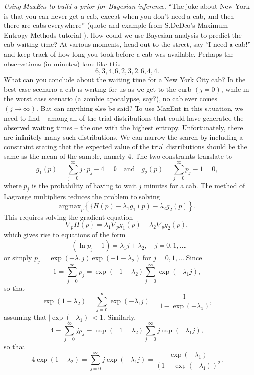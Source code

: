 \begin{Example} {\textit{Using MaxEnt to build a prior for Bayesian inference}.} ``The joke about New York is that you can never get a cab, except when you don't need a cab, and then there are cabs everywhere'' (quote and example from S.DeDeo's Maximum Entropy Methods tutorial \cite{BDA_N14}). How could we use Bayesian analysis to predict the cab waiting time? At various moments, head out to the street, say ``I need a cab!'' and keep track of how long you took before a cab was available. Perhaps the observations (in minutes) look like this $$6,3,4,6,2,3,2,6,4,4.$$ What can you conclude about  the waiting time for a New York City cab? In the best case scenario a cab is waiting for us as we get to the curb $(j=0)$, while in the worst case scenario (a zombie apocalypse, say?), no cab ever comes $(j\to\infty)$. But can anything else be said? \newl 
To use MaxEnt in this situation, we need to find -- among all of the trial distributions that could have generated the observed waiting times -- the one with the highest entropy. Unfortunately, there are infinitely many such distributions. We can narrow the search by including a constraint stating that the expected value of the trial distributions should be the same as the mean of the sample, namely 4.  \newl The two constraints translate to $$g_1(p)=\sum_{j=0}^{\infty}j\cdot p_j -4=0 \quad \mbox{and}\quad g_2(p)= \sum_{j=0}^{\infty}p_j-1=0,$$ where $p_j$ is the probability of having to wait $j$ minutes for a cab. \newl The method of Lagrange multipliers reduces the problem to solving $$\text{argmax}_{p} \left\{\{H(p) - \lambda_1 g_1(p)-\lambda_2g_2(p)\right\}.$$ This requires solving the gradient equation $$\nabla_p H(p) = \lambda_1\nabla_p g_1(p) + \lambda_2\nabla_p g_2(p), $$ which gives rise to equations of the form $$-(\ln p_j +1) = \lambda_1 j + \lambda_2, \quad {j=0,1, \ldots,}$$ or simply $p_j=\exp(-\lambda_1j)\exp(-1-\lambda_2)$ for $j=0, 1, \ldots $ Since $$1=\sum_{j=0}^{\infty}p_j = \exp(-1-\lambda_2)\sum_{j=0}^{\infty}\exp(-\lambda_1j), $$ so that \begin{equation}\label{eq1}\exp(1+\lambda_2) = \sum_{j=0}^{\infty}\exp(-\lambda_1j)=\frac{1}{1-\exp(-\lambda_1)},\end{equation} assuming that $|\exp(-\lambda_1)|<1$. Similarly, $$4=\sum_{j=0}^{\infty}jp_j = \exp(-1-\lambda_2)\sum_{j=0}^{\infty}j\exp(-\lambda_1j), $$ so that \begin{equation}\label{eq2}4\exp(1+\lambda_2) = \sum_{j=0}^{\infty}j\exp(-\lambda_1j)=\frac{\exp(-\lambda_1)}{(1-\exp(-\lambda_1))^2}.\end{equation}

\end{Example}
